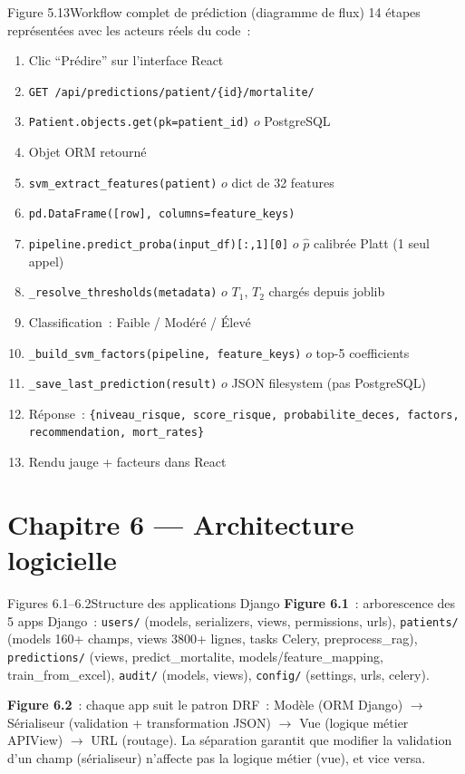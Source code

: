 \documentclass[12pt,a4paper]{article}
\begin{document}
\begin{figbox}{Figure 5.13}{Workflow complet de prédiction (diagramme de flux)}
14 étapes représentées avec les acteurs réels du code~:
\begin{enumerate}[leftmargin=2em, itemsep=1pt]
  \item Clic ``Prédire'' sur l'interface React
  \item \texttt{GET /api/predictions/patient/\{id\}/mortalite/}
  \item \texttt{Patient.objects.get(pk=patient\_id)} $	o$ PostgreSQL
  \item Objet ORM retourné
  \item \texttt{svm\_extract\_features(patient)} $	o$ dict de 32 features
  \item \texttt{pd.DataFrame([row], columns=feature\_keys)}
  \item \texttt{pipeline.predict\_proba(input\_df)[:,1][0]} $	o$ $\hat{p}$ calibrée Platt (1 seul appel)
  \item \texttt{\_resolve\_thresholds(metadata)} $	o$ $T_1$, $T_2$ chargés depuis joblib
  \item Classification~: Faible / Modéré / Élevé
  \item \texttt{\_build\_svm\_factors(pipeline, feature\_keys)} $	o$ top-5 coefficients
  \item \texttt{\_save\_last\_prediction(result)} $	o$ JSON filesystem (pas PostgreSQL)
  \item Réponse~: \texttt{\{niveau\_risque, score\_risque, probabilite\_deces,
    factors, recommendation, mort\_rates\}}
  \item Rendu jauge + facteurs dans React
\end{enumerate}
\end{figbox}

\section{Chapitre 6 --- Architecture logicielle}

\begin{figbox}{Figures 6.1--6.2}{Structure des applications Django}
\textbf{Figure 6.1}~: arborescence des 5 apps Django~: \texttt{users/} (models,
serializers, views, permissions, urls), \texttt{patients/} (models 160+ champs,
views 3800+ lignes, tasks Celery, preprocess\_rag), \texttt{predictions/}
(views, predict\_mortalite, models/feature\_mapping, train\_from\_excel),
\texttt{audit/} (models, views), \texttt{config/} (settings, urls, celery).

\textbf{Figure 6.2}~: chaque app suit le patron DRF~: Modèle (ORM Django)
$\rightarrow$ Sérialiseur (validation + transformation JSON) $\rightarrow$
Vue (logique métier APIView) $\rightarrow$ URL (routage). La séparation garantit
que modifier la validation d'un champ (sérialiseur) n'affecte pas la logique
métier (vue), et vice versa.
\end{figbox}
\end{document}
